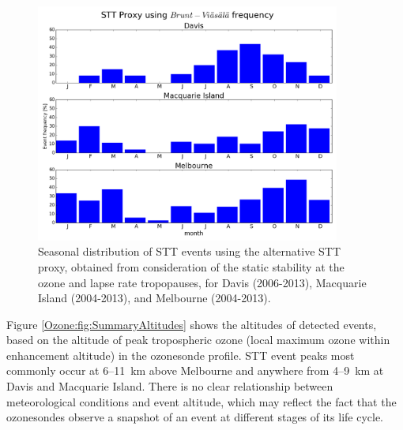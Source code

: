   \begin{figure}[t]
    \includegraphics[width=10cm]{Figures/Ozone/AndrewProxySTTV2.png}
    \caption{Seasonal distribution of STT events using the alternative STT proxy, obtained from consideration of the static stability at the ozone and lapse rate tropopauses, for Davis (2006-2013), Macquarie Island (2004-2013), and Melbourne (2004-2013).}
    \label{Ozone:fig:AndrewProxySTT}
  \end{figure}
  
  Figure \ref{Ozone:fig:SummaryAltitudes} shows the altitudes of detected events, based on the altitude of peak tropospheric ozone (local maximum ozone within enhancement altitude) in the ozonesonde profile.
  STT event peaks most commonly occur at 6--11~km above Melbourne and anywhere from 4--9~km at Davis and Macquarie Island.
  There is no clear relationship between meteorological conditions and event altitude, which may reflect the fact that the ozonesondes observe a snapshot of an event at different stages of its life cycle.
  
